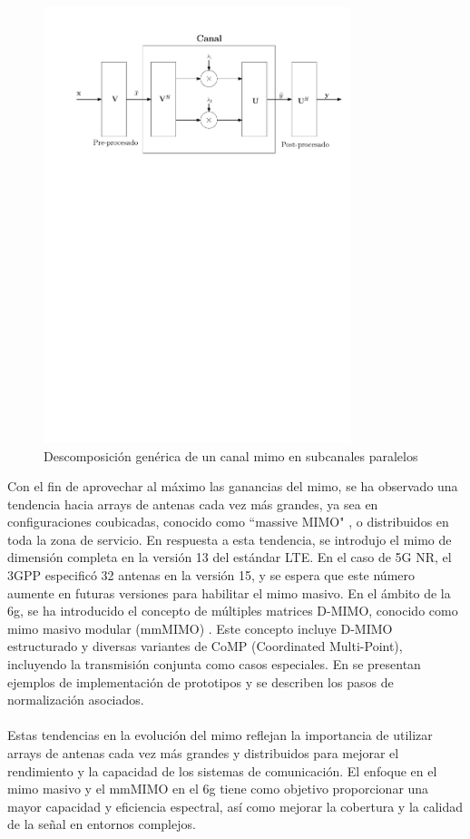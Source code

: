 \begin{figure}[h!]
    \centering
    \includegraphics[width=0.8\textwidth]{archivos/img/teoria/fig_3.pdf}
    \caption{Descomposición genérica de un canal \gls{mimo} en subcanales paralelos}
    \label{fig:fig_3}
\end{figure}

Con el fin de aprovechar al máximo las ganancias del \gls{mimo}, se ha observado una tendencia hacia arrays de antenas cada vez más grandes, ya sea en configuraciones coubicadas, conocido como ``massive MIMO" \cite{bjornson2016massive}, o distribuidos en toda la zona de servicio. En respuesta a esta tendencia, se introdujo el \gls{mimo} de dimensión completa en la versión 13 del estándar LTE. En el caso de 5G NR, el 3GPP especificó 32 antenas en la versión 15, y se espera que este número aumente en futuras versiones para habilitar el \gls{mimo} masivo. En el ámbito de la \gls{6g}, se ha introducido el concepto de múltiples matrices D-MIMO, conocido como \gls{mimo} masivo modular (mmMIMO) \cite{jeon2021mimo}. Este concepto incluye D-MIMO estructurado y diversas variantes de CoMP (Coordinated Multi-Point), incluyendo la transmisión conjunta como casos especiales. En \cite{jeon2021mimo} se presentan ejemplos de implementación de prototipos y se describen los pasos de normalización asociados.\\
\\
Estas tendencias en la evolución del \gls{mimo} reflejan la importancia de utilizar arrays de antenas cada vez más grandes y distribuidos para mejorar el rendimiento y la capacidad de los sistemas de comunicación. El enfoque en el \gls{mimo} masivo y el mmMIMO en el \gls{6g} tiene como objetivo proporcionar una mayor capacidad y eficiencia espectral, así como mejorar la cobertura y la calidad de la señal en entornos complejos.


